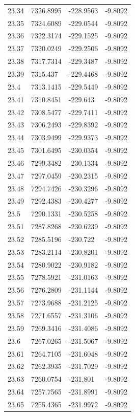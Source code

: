 \begin{table}[H]
\begin{tabular}{llll}
23.34 & 7326.8995 & -228.9563 & -9.8092 \\
23.35 & 7324.6089 & -229.0544 & -9.8092 \\
23.36 & 7322.3174 & -229.1525 & -9.8092 \\
23.37 & 7320.0249 & -229.2506 & -9.8092 \\
23.38 & 7317.7314 & -229.3487 & -9.8092 \\
23.39 & 7315.437 & -229.4468 & -9.8092 \\
23.4 & 7313.1415 & -229.5449 & -9.8092 \\
23.41 & 7310.8451 & -229.643 & -9.8092 \\
23.42 & 7308.5477 & -229.7411 & -9.8092 \\
23.43 & 7306.2493 & -229.8392 & -9.8092 \\
23.44 & 7303.9499 & -229.9373 & -9.8092 \\
23.45 & 7301.6495 & -230.0354 & -9.8092 \\
23.46 & 7299.3482 & -230.1334 & -9.8092 \\
23.47 & 7297.0459 & -230.2315 & -9.8092 \\
23.48 & 7294.7426 & -230.3296 & -9.8092 \\
23.49 & 7292.4383 & -230.4277 & -9.8092 \\
23.5 & 7290.1331 & -230.5258 & -9.8092 \\
23.51 & 7287.8268 & -230.6239 & -9.8092 \\
23.52 & 7285.5196 & -230.722 & -9.8092 \\
23.53 & 7283.2114 & -230.8201 & -9.8092 \\
23.54 & 7280.9022 & -230.9182 & -9.8092 \\
23.55 & 7278.5921 & -231.0163 & -9.8092 \\
23.56 & 7276.2809 & -231.1144 & -9.8092 \\
23.57 & 7273.9688 & -231.2125 & -9.8092 \\
23.58 & 7271.6557 & -231.3106 & -9.8092 \\
23.59 & 7269.3416 & -231.4086 & -9.8092 \\
23.6 & 7267.0265 & -231.5067 & -9.8092 \\
23.61 & 7264.7105 & -231.6048 & -9.8092 \\
23.62 & 7262.3935 & -231.7029 & -9.8092 \\
23.63 & 7260.0754 & -231.801 & -9.8092 \\
23.64 & 7257.7565 & -231.8991 & -9.8092 \\
23.65 & 7255.4365 & -231.9972 & -9.8092 \\

\end{tabular}
\end{table}
